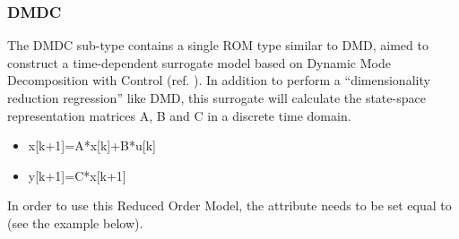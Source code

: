 \subsubsection{DMDC}
\label{subsubsec:polyexponential}
The DMDC sub-type contains a single ROM type similar to DMD, aimed to construct a time-dependent surrogate model based on Dynamic 
Mode Decomposition with Control (ref. \cite{proctor2016dynamic}).
In addition to perform a ``dimensionality reduction regression'' like DMD, this surrogate will calculate the state-space 
representation matrices A, B and  C in a discrete time domain. 

\begin{itemize}
\item x[k+1]=A*x[k]+B*u[k]
\item y[k+1]=C*x[k+1] 
\end{itemize}

%
In order to use this Reduced Order Model, the  attribute
 needs to be set equal to  (see the example
below).
%
\subnodeIntro

